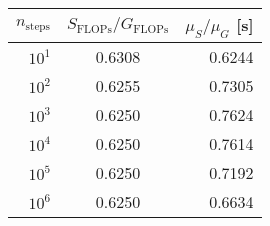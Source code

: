 \begin{tabular}{r|c|r}
\toprule
$n_{\mathrm{steps}}$ & $S_{\mathrm{FLOPs}} / G_{\mathrm{FLOPs}}$ & $\mu_{S} / \mu_{G}$ [s] \\
\midrule
              $10^1$ &                                    0.6308 &                  0.6244 \\
              $10^2$ &                                    0.6255 &                  0.7305 \\
              $10^3$ &                                    0.6250 &                  0.7624 \\
              $10^4$ &                                    0.6250 &                  0.7614 \\
              $10^5$ &                                    0.6250 &                  0.7192 \\
              $10^6$ &                                    0.6250 &                  0.6634 \\
\bottomrule
\end{tabular}
